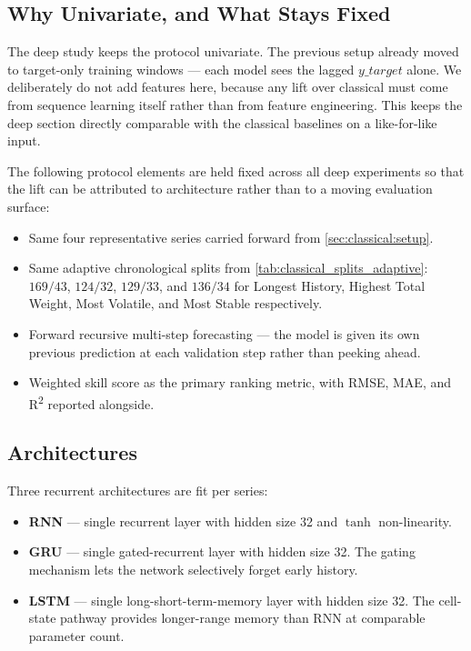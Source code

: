 \subsection{Why Univariate, and What Stays Fixed}
\label{sec:deep:setup}

The deep study keeps the protocol univariate. The previous setup already moved to target-only training windows --- each model sees the lagged $y\_target$ alone. We deliberately do not add features here, because any lift over classical must come from sequence learning itself rather than from feature engineering. This keeps the deep section directly comparable with the classical baselines on a like-for-like input.

The following protocol elements are held fixed across all deep experiments so that the lift can be attributed to architecture rather than to a moving evaluation surface:

\begin{itemize}
  \item Same four representative series carried forward from \cref{sec:classical:setup}.
  \item Same adaptive chronological splits from \cref{tab:classical_splits_adaptive}: $169/43$, $124/32$, $129/33$, and $136/34$ for Longest History, Highest Total Weight, Most Volatile, and Most Stable respectively.
  \item Forward recursive multi-step forecasting --- the model is given its own previous prediction at each validation step rather than peeking ahead.
  \item Weighted skill score as the primary ranking metric, with RMSE, MAE, and R\textsuperscript{2} reported alongside.
\end{itemize}

\subsection{Architectures}
\label{sec:deep:architectures}

Three recurrent architectures are fit per series:

\begin{itemize}
  \item \textbf{RNN} --- single recurrent layer with hidden size 32 and $\tanh$ non-linearity.
  \item \textbf{GRU} --- single gated-recurrent layer with hidden size 32. The gating mechanism lets the network selectively forget early history.
  \item \textbf{LSTM} --- single long-short-term-memory layer with hidden size 32. The cell-state pathway provides longer-range memory than RNN at comparable parameter count.
\end{itemize}

